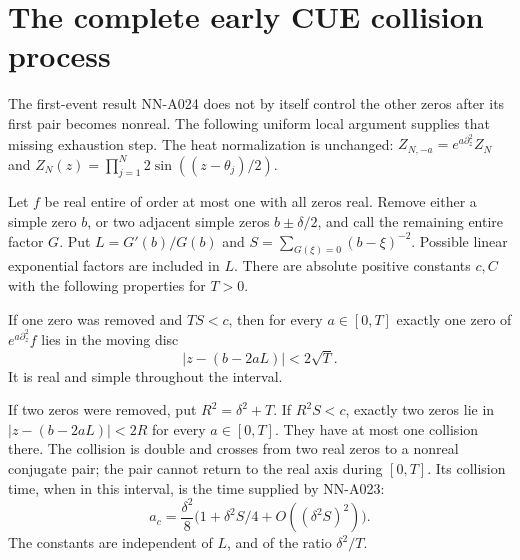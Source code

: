 \section{The complete early CUE collision process}
\label{sec:analytic-cue-collision-process}

The first-event result NN-A024 does not by itself control the
other zeros after its first pair becomes nonreal. The following
uniform local argument supplies that missing exhaustion step.
The heat normalization is unchanged:
$Z_{N,-a}=e^{a\partial_z^2}Z_N$ and
$Z_N(z)=\prod_{j=1}^N2\sin((z-\theta_j)/2)$.

\begin{lemma}
\label{lem:analytic-uniform-clusters}
Let $f$ be real entire of order at most one with all zeros real.
Remove either a simple zero $b$, or two adjacent simple zeros
$b\pm\delta/2$, and call the remaining entire factor $G$.
Put $L=G'(b)/G(b)$ and $S=\sum_{G(\xi)=0}(b-\xi)^{-2}$.
Possible linear exponential factors are included in $L$.
There are absolute positive constants $c,C$ with the following
properties for $T>0$.

If one zero was removed and $TS<c$, then for every $a\in[0,T]$
exactly one zero of $e^{a\partial_z^2}f$ lies in the moving disc
\[
                  |z-(b-2aL)|<2\sqrt T.
\]
It is real and simple throughout the interval.

If two zeros were removed, put $R^2=\delta^2+T$. If
$R^2S<c$, exactly two zeros lie in
$|z-(b-2aL)|<2R$ for every $a\in[0,T]$. They have at most
one collision there. The collision is double and crosses from
two real zeros to a nonreal conjugate pair; the pair cannot
return to the real axis during $[0,T]$. Its collision time,
when in this interval, is the time supplied by NN-A023:
\[
             a_c=\frac{\delta^2}{8}
                \bigl(1+\delta^2S/4+O((\delta^2S)^2)\bigr).
\]
The constants are independent of $L$, and of the ratio
$\delta^2/T$.
\end{lemma}


